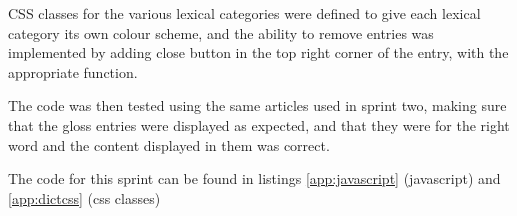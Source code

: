 CSS classes for the various lexical categories were defined to give each lexical category its own colour scheme, and the ability to remove entries was implemented by adding close button in the top right corner of the entry, with the appropriate function. 

The code was then tested using the same articles used in sprint two, making sure that the gloss entries were displayed as expected, and that they were for the right word and the content displayed in them was correct. 

The code for this sprint can be found in listings \ref{app:javascript} (javascript) and \ref{app:dictcss} (css classes)

